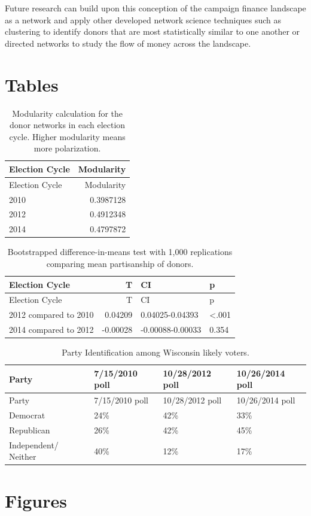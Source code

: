 \documentclass[12pt,]{article}
\begin{document}
Future research can build upon this conception of the campaign finance
landscape as a network and apply other developed network science
techniques such as clustering to identify donors that are most
statistically similar to one another or directed networks to study the
flow of money across the landscape.

\newpage

\hypertarget{tables}{%
\section{Tables}\label{tables}}

\begin{longtable}[]{@{}lr@{}}
\caption{Modularity calculation for the donor networks in each election
cycle. Higher modularity means more polarization.}\tabularnewline
\toprule
Election Cycle & Modularity\tabularnewline
\midrule
\endfirsthead
\toprule
Election Cycle & Modularity\tabularnewline
\midrule
\endhead
2010 & 0.3987128\tabularnewline
2012 & 0.4912348\tabularnewline
2014 & 0.4797872\tabularnewline
\bottomrule
\end{longtable}

\newpage

\begin{longtable}[]{@{}lrll@{}}
\caption{Bootstrapped difference-in-means test with 1,000 replications
comparing mean partisanship of donors.}\tabularnewline
\toprule
Election Cycle & T & CI & p\tabularnewline
\midrule
\endfirsthead
\toprule
Election Cycle & T & CI & p\tabularnewline
\midrule
\endhead
2012 compared to 2010 & 0.04209 & 0.04025-0.04393 &
\textless.001\tabularnewline
2014 compared to 2012 & -0.00028 & -0.00088-0.00033 &
0.354\tabularnewline
\bottomrule
\end{longtable}

\newpage

\begin{longtable}[]{@{}llll@{}}
\caption{Party Identification among Wisconsin likely
voters.}\tabularnewline
\toprule
Party & 7/15/2010 poll & 10/28/2012 poll & 10/26/2014
poll\tabularnewline
\midrule
\endfirsthead
\toprule
Party & 7/15/2010 poll & 10/28/2012 poll & 10/26/2014
poll\tabularnewline
\midrule
\endhead
Democrat & 24\% & 42\% & 33\%\tabularnewline
Republican & 26\% & 42\% & 45\%\tabularnewline
Independent/ Neither & 40\% & 12\% & 17\%\tabularnewline
\bottomrule
\end{longtable}

\newpage

\hypertarget{figures}{%
\section{Figures}\label{figures}}
\end{document}
